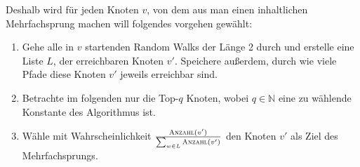 Deshalb wird für jeden Knoten $v$, von dem aus man einen inhaltlichen
Mehrfachsprung machen will folgendes vorgehen gewählt:
\begin{enumerate}
    \item Gehe alle in $v$ startenden Random Walks der Länge 2 durch
          und erstelle eine Liste $L$, der erreichbaren Knoten $v'$. Speichere
          außerdem, durch wie viele Pfade diese Knoten $v'$ jeweils erreichbar sind.
    \item Betrachte im folgenden nur die Top-$q$ Knoten, wobei $q \in \mathbb{N}$
          eine zu wählende Konstante des Algorithmus ist.
    \item Wähle mit Wahrscheinlichkeit $\frac{\Call{Anzahl}{v'}}{\sum_{w \in L} \Call{Anzahl}{v'}}$
          den Knoten $v'$ als Ziel des Mehrfachsprungs.
\end{enumerate}


